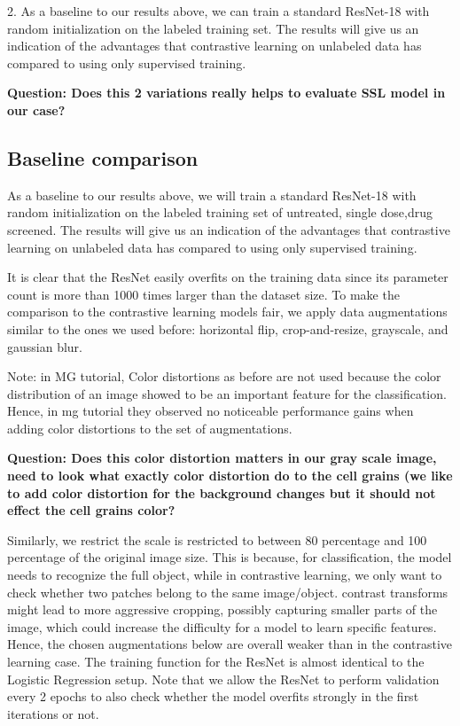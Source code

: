 \documentclass[12pt,twoside,a4paper,parskip]{scrbook} %
\begin{document}
2. As a baseline to our results above, we can train a standard ResNet-18 with random initialization on the labeled training set. The results will give us an indication of the advantages that contrastive learning on unlabeled data has compared to using only supervised training.

\textbf{Question: Does this 2 variations really helps to evaluate SSL model in our case?} 
\subsection{Baseline comparison}
As a baseline to our results above, we will train a standard ResNet-18 with random initialization on the labeled training set of untreated, single dose,drug screened. The results will give us an indication of the advantages that contrastive learning on unlabeled data has compared to using only supervised training.

It is clear that the ResNet easily overfits on the training data since its parameter count is more than 1000 times larger than the dataset size. To make the comparison to the contrastive learning models fair, we apply data augmentations similar to the ones we used before: horizontal flip, crop-and-resize, grayscale, and gaussian blur. 

Note: in MG tutorial, Color distortions as before are not used because the color distribution of an image showed to be an important feature for the classification. Hence, in mg tutorial they observed no noticeable performance gains when adding color distortions to the set of augmentations.

\textbf{Question: Does this color distortion matters in our gray scale image, need to look what exactly color distortion do to the cell grains (we like to add color distortion for the background changes but it should not effect the cell grains color?} 

Similarly, we restrict  the scale is restricted to between 80 percentage and 100 percentage of the original image size. This is because, for classification, the model needs to recognize the full object, while in contrastive learning, we only want to check whether two patches belong to the same image/object. contrast transforms might lead to more aggressive cropping, possibly capturing smaller parts of the image, which could increase the difficulty for a model to learn specific features. Hence, the chosen augmentations below are overall weaker than in the contrastive learning case.
The training function for the ResNet is almost identical to the Logistic Regression setup. Note that we allow the ResNet to perform validation every 2 epochs to also check whether the model overfits strongly in the first iterations or not.
\end{document}

